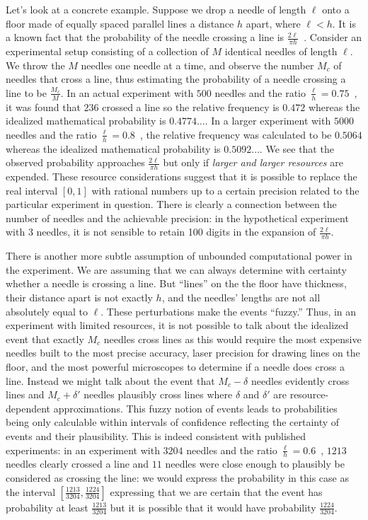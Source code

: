 \documentclass{article}
\theoremstyle{remark}
\begin{document}
Let's look at a concrete example. Suppose we drop a needle of length
$\ell$ onto a floor made of equally spaced parallel lines a distance
$h$ apart, where $\ell<h$. It is a known fact that the probability of
the needle crossing a line is
$\frac{2\ell}{\pi
  h}$~\cite{Buffon1777,DeMorgan1872,Hall1873,Uspensky1937}.
Consider an experimental setup consisting of a collection of $M$
identical needles of length $\ell$. We throw the $M$ needles one
needle at a time, and observe the number $M_c$ of needles that cross a
line, thus estimating the probability of a needle crossing a line to
be $\frac{M_c}{M}$. In an actual experiment with $500$ needles and the
ratio $\frac{\ell}{h}=0.75$~\cite{Hall1873}, it was found that $236$
crossed a line so the relative frequency is $0.472$ whereas the
idealized mathematical probability is $0.4774\ldots$.  In a larger
experiment with $5000$ needles and the ratio
$\frac{\ell}{h}=0.8$~\cite{Uspensky1937}, the relative frequency was
calculated to be $0.5064$ whereas the idealized mathematical
probability is $0.5092\ldots$. We see that the observed probability
approaches $\frac{2\ell}{\pi h}$ but only if \emph{larger and larger
  resources} are expended. These resource considerations suggest that
it is possible to replace the real interval $[0,1]$ with rational
numbers up to a certain precision related to the particular experiment
in question. There is clearly a connection between the number of
needles and the achievable precision: in the hypothetical experiment
with 3 needles, it is not sensible to retain 100 digits in the
expansion of $\frac{2\ell}{\pi h}$.

There is another more subtle assumption of unbounded computational
power in the experiment. We are assuming that we can always determine
with certainty whether a needle is crossing a line. But ``lines'' on
the the floor have thickness, their distance apart is not exactly $h$,
and the needles' lengths are not all absolutely equal to $\ell$.
These perturbations make the events ``fuzzy.'' Thus, in an experiment
with limited resources, it is not possible to talk about the idealized
event that exactly $M_c$ needles cross lines as this would require the
most expensive needles built to the most precise accuracy, laser
precision for drawing lines on the floor, and the most powerful
microscopes to determine if a needle does cross a line. Instead we
might talk about the event that $M_c-\delta$ needles evidently cross
lines and $M_c+\delta'$ needles plausibly cross lines where $\delta$ and
$\delta'$ are resource-dependent approximations. This fuzzy notion of
events leads to probabilities being only calculable within intervals
of confidence reflecting the certainty of events and their
plausibility. This is indeed consistent with published experiments: in
an experiment with $3204$ needles and the ratio
$\frac{\ell}{h}=0.6$~\cite{DeMorgan1872}, $1213$ needles clearly
crossed a line and $11$ needles were close enough to plausibly be
considered as crossing the line: we would express the probability in
this case as the interval
$\left[\frac{1213}{3204},\frac{1224}{3204}\right]$ expressing that we
are certain that the event has probability at least
$\frac{1213}{3204}$ but it is possible that it would have probability
$\frac{1224}{3204}$.
\end{document}
